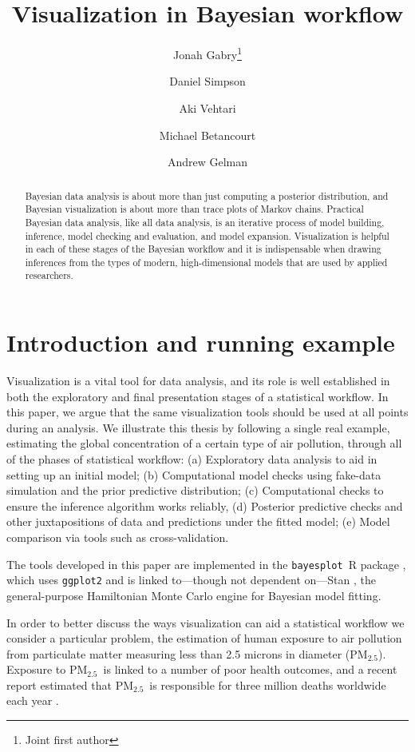 \documentclass{statsoc}
\title{Visualization in Bayesian workflow}
\author[Gabry {\it et al.}]{Jonah Gabry\footnote{Joint first author}}
\author[Gabry {\it et al.}]{Daniel Simpson\footnotemark[1]}
\author[Gabry {\it et al.}]{Aki Vehtari}
\author[Gabry {\it et al.}]{Michael Betancourt}
\author[Gabry {\it et al.}]{Andrew Gelman}
\newcommand{\PM}{PM$_{2.5}$}
\newcommand{\bayesplot}{{\tt bayesplot}}
\begin{document}
\maketitle

\begin{abstract}
Bayesian data analysis is about more than just computing a posterior
distribution, and Bayesian visualization is about more than trace plots of
Markov chains. Practical Bayesian data analysis, like all data analysis, is an
iterative process of model building, inference, model checking and evaluation,
and model expansion. Visualization is helpful in each of these stages of the
Bayesian workflow and it is indispensable when drawing inferences from the types
of  modern, high-dimensional models that are used by applied researchers.
\end{abstract}


\section{Introduction and running example}
\label{sec:intro}

Visualization is a vital tool for data analysis, and its role is
well established in both the exploratory and final presentation stages of a
statistical workflow. In this paper, we argue that the same visualization tools
should be used at all points during an analysis.  We illustrate this thesis by
following a single real example, estimating the global concentration of a
certain type of air pollution, through all of the phases of statistical
workflow:
(a) Exploratory data analysis to aid in setting up an initial model;
(b) Computational model checks using fake-data simulation and the prior
      predictive distribution;
(c) Computational checks to ensure the inference algorithm works reliably,
(d) Posterior predictive checks and other juxtapositions of data and predictions
      under the fitted model;
(e)  Model comparison via tools such as cross-validation.

The tools developed in this paper are implemented in the \bayesplot\ R package
\citep{bayesplotRpackage, rcore}, which uses {\tt ggplot2} \citep{ggplot2Rpackage}
and is linked to---though not dependent on---Stan \citep{rstan,stanmanual},
the general-purpose Hamiltonian Monte Carlo engine for Bayesian model fitting.

In order to better discuss the ways visualization can aid a statistical
workflow we consider a particular problem, the estimation of human exposure to
air pollution from particulate matter measuring less than 2.5 microns in
diameter (\PM).  Exposure to \PM\ is linked to a number of poor health outcomes,
and a recent report estimated that \PM\ is responsible for three million deaths
worldwide each year \citep{shaddick2017data}.
\end{document}
